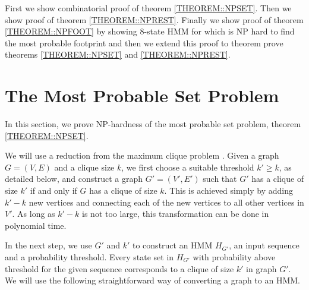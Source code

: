 First we show combinatorial proof of theorem \ref{THEOREM::NPSET}. Then we show
proof of theorem \ref{THEOREM::NPREST}. Finally we show proof of theorem
\ref{THEOREM::NPFOOT} by showing $8$-state HMM for which is NP hard to find the
most probable footprint and then we extend this proof to theorem
prove theorems \ref{THEOREM::NPSET} and \ref{THEOREM::NPREST}.

\section{The Most Probable Set Problem}
\label{sec:set}


In this section, we prove NP-hardness of the most probable set problem, theorem
\ref{THEOREM::NPSET}.

We will use a reduction from the maximum clique
problem \cite{Garey1990}.  Given a graph $G=(V,E)$ and a clique
size $k$, we first choose a suitable threshold $k'\ge k$, as
detailed below, and construct a graph $G'=(V',E')$ such that $G'$ has
a clique of size $k'$ if and only if $G$ has a clique of size
$k$. This is achieved simply by adding $k'-k$ new vertices and
connecting each of the new vertices to all other vertices in $V'$.
As long as $k'-k$ is not too large, this transformation can be done in
polynomial time.

In the next step, we use $G'$ and $k'$ to construct an HMM $H_{G'}$, an input
sequence and a probability threshold. Every state set in $H_{G'}$ with
probability above threshold for the given sequence corresponds to a clique of
size $k'$ in graph $G'$. We will use the following straightforward way of
converting a graph to an HMM.

